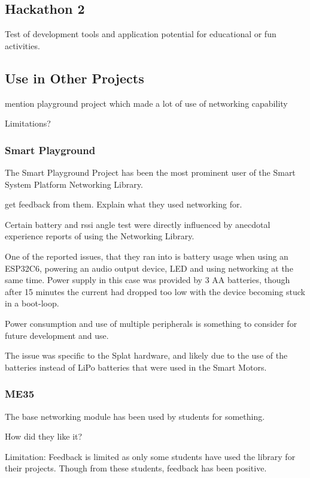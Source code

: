 \subsection{\label{sec:res_hackathon2}Hackathon 2}

Test of development tools and application potential for educational or fun activities.

\subsection{\label{sec:res_honourablementions}Use in Other Projects}

mention playground project which made a lot of use of networking capability

Limitations?

\subsubsection{\label{sec:res_smartplayground}Smart Playground}

The Smart Playground Project has been the most prominent user of the Smart System Platform Networking Library. 

get feedback from them. Explain what they used networking for.

Certain battery and rssi angle test were directly influenced by anecdotal experience reports of using the Networking Library.

One of the reported issues, that they ran into is battery usage when using an ESP32C6, powering an audio output device, LED and using networking at the same time. Power supply in this case was provided by 3 AA batteries, though after 15 minutes the current had dropped too low with the device becoming stuck in a boot-loop.

Power consumption and use of multiple peripherals is something to consider for future development and use. 

The issue was specific to the Splat hardware, and likely due to the use of the batteries instead of LiPo batteries that were used in the Smart Motors. 

\subsubsection{\label{sec:res_me35}ME35}

The base networking module has been used by students for something.

How did they like it?

Limitation: Feedback is limited as only some students have used the library for their projects. Though from these students, feedback has been positive.